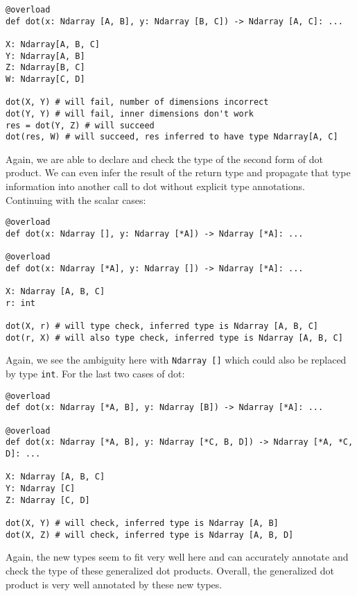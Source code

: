 \documentclass{report}
\begin{document}
\begin{singlespace*}
\begin{verbatim}
@overload
def dot(x: Ndarray [A, B], y: Ndarray [B, C]) -> Ndarray [A, C]: ...

X: Ndarray[A, B, C]
Y: Ndarray[A, B]
Z: Ndarray[B, C]
W: Ndarray[C, D]

dot(X, Y) # will fail, number of dimensions incorrect
dot(Y, Y) # will fail, inner dimensions don't work
res = dot(Y, Z) # will succeed
dot(res, W) # will succeed, res inferred to have type Ndarray[A, C]\end{verbatim}
\end{singlespace*}
Again, we are able to declare and check the type of the second form of dot product. We can even infer the result of the return type and propagate that type information into another call to dot without explicit type annotations. Continuing with the scalar cases:

\begin{singlespace*}
\begin{verbatim}
@overload
def dot(x: Ndarray [], y: Ndarray [*A]) -> Ndarray [*A]: ...

@overload
def dot(x: Ndarray [*A], y: Ndarray []) -> Ndarray [*A]: ...

X: Ndarray [A, B, C]
r: int

dot(X, r) # will type check, inferred type is Ndarray [A, B, C]
dot(r, X) # will also type check, inferred type is Ndarray [A, B, C]\end{verbatim}
\end{singlespace*}
Again, we see the ambiguity here with \texttt{Ndarray []} which could also be replaced by type \texttt{int}. For the last two cases of dot:

\begin{singlespace*}
\begin{verbatim}
@overload
def dot(x: Ndarray [*A, B], y: Ndarray [B]) -> Ndarray [*A]: ...

@overload
def dot(x: Ndarray [*A, B], y: Ndarray [*C, B, D]) -> Ndarray [*A, *C, D]: ...

X: Ndarray [A, B, C]
Y: Ndarray [C]
Z: Ndarray [C, D]

dot(X, Y) # will check, inferred type is Ndarray [A, B]
dot(X, Z) # will check, inferred type is Ndarray [A, B, D]\end{verbatim}
\end{singlespace*}
Again, the new types seem to fit very well here and can accurately annotate and check the type of these generalized dot products. Overall, the generalized dot product is very well annotated by these new types.
\end{document}
